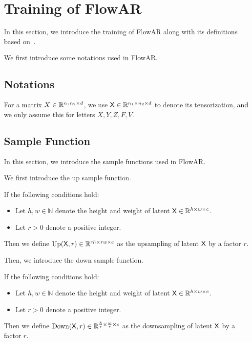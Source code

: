 

\section{Training of FlowAR}\label{sec:training_of_flowar}

In this section, we introduce the training of FlowAR along with its definitions based on~\cite{ryh+24}.


We first introduce some notations used in FlowAR.
\subsection{Notations}\label{sub:notations}
For a matrix $X \in \mathbb{R}^{n_1 n_2 \times d}$, we use $\mathsf{X} \in \mathbb{R}^{n_1 \times n_2 \times d}$ to denote its tensorization, and we only assume this for letters $X, Y, Z, F, V$.

\subsection{Sample Function}
In this section, we introduce the sample functions used in FlowAR.

We first introduce the up sample function.

\begin{definition}\label{def:up_sample_function}
    If the following conditions hold:
    \begin{itemize}
        \item Let $h, w \in \mathbb{N}$ denote the height and weight of latent $\mathsf{X} \in \mathbb{R}^{h \times w \times c}$.
        \item Let $r > 0$ denote a positive integer.
    \end{itemize}
    Then we define $\mathrm{Up}(\mathsf{X},r) \in \mathbb{R}^{rh \times rw \times c}$ as the upsampling of latent $\mathsf{X}$ by a factor $r$.
\end{definition}

Then, we introduce the down sample function.
\begin{definition}\label{def:down_sample_function}
    If the following conditions hold:
    \begin{itemize}
        \item  Let $h, w \in \mathbb{N}$ denote the height and weight of latent $\mathsf{X}  \in \mathbb{R}^{h \times w \times c}$.
        \item Let $r > 0$ denote a positive integer.
    \end{itemize}
    Then we define $\mathrm{Down}(\mathsf{X} ,r) \in \mathbb{R}^{\frac{h}{r} \times \frac{w}{r} \times c}$ as the downsampling of latent $\mathsf{X} $ by a factor $r$.
\end{definition}

